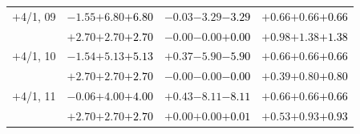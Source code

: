 \documentclass[compress]{beamer}
\begin{document}
\begin{frame}
\begin{tabular}{r | c | c | c}
$+$4/1, 09 & $-1.55$\hspace{0.1 cm}$+6.80$\hspace{0.1 cm}\textcolor{black}{$+6.80$} & $-0.03$\hspace{0.1 cm}$-3.29$\hspace{0.1 cm}\textcolor{black}{$-3.29$} & $+0.66$\hspace{0.1 cm}$+0.66$\hspace{0.1 cm}\textcolor{black}{$+0.66$} \\
           & $+2.70$\hspace{0.1 cm}$+2.70$\hspace{0.1 cm}\textcolor{black}{$+2.70$} & $-0.00$\hspace{0.1 cm}$-0.00$\hspace{0.1 cm}\textcolor{black}{$+0.00$} & $+0.98$\hspace{0.1 cm}$+1.38$\hspace{0.1 cm}\textcolor{black}{$+1.38$} \\
$+$4/1, 10 & $-1.54$\hspace{0.1 cm}$+5.13$\hspace{0.1 cm}\textcolor{black}{$+5.13$} & $+0.37$\hspace{0.1 cm}$-5.90$\hspace{0.1 cm}\textcolor{black}{$-5.90$} & $+0.66$\hspace{0.1 cm}$+0.66$\hspace{0.1 cm}\textcolor{black}{$+0.66$} \\
           & $+2.70$\hspace{0.1 cm}$+2.70$\hspace{0.1 cm}\textcolor{black}{$+2.70$} & $-0.00$\hspace{0.1 cm}$-0.00$\hspace{0.1 cm}\textcolor{black}{$-0.00$} & $+0.39$\hspace{0.1 cm}$+0.80$\hspace{0.1 cm}\textcolor{black}{$+0.80$} \\
$+$4/1, 11 & $-0.06$\hspace{0.1 cm}$+4.00$\hspace{0.1 cm}\textcolor{black}{$+4.00$} & $+0.43$\hspace{0.1 cm}$-8.11$\hspace{0.1 cm}\textcolor{black}{$-8.11$} & $+0.66$\hspace{0.1 cm}$+0.66$\hspace{0.1 cm}\textcolor{black}{$+0.66$} \\
           & $+2.70$\hspace{0.1 cm}$+2.70$\hspace{0.1 cm}\textcolor{black}{$+2.70$} & $+0.00$\hspace{0.1 cm}$+0.00$\hspace{0.1 cm}\textcolor{black}{$+0.01$} & $+0.53$\hspace{0.1 cm}$+0.93$\hspace{0.1 cm}\textcolor{black}{$+0.93$} \\

\end{tabular}
\end{frame}
\end{document}
